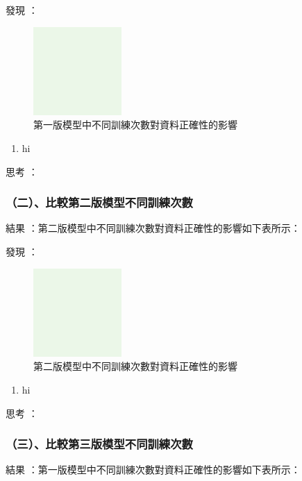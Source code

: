 \documentclass[8pt,a4paper,MingLiU,UTF8]{article}
\def\xeCJKembold{0.4}
\def\saveCJKnode{\dimen255\lastkern}
\def\restoreCJKnode{\kern-\dimen255\kern\dimen255}
\let\CJKoldsymbol\CJKsymbol
\let\CJKoldpunctsymbol\CJKpunctsymbol
\def\CJKfakeboldsymbol#1{%
	\special{pdf:literal direct 2 Tr \xeCJKembold\space w}%
	\CJKoldsymbol{#1}%
	\saveCJKnode
	\special{pdf:literal direct 0 Tr}%
	\restoreCJKnode}
\def\CJKfakeboldpunctsymbol#1{%
	\special{pdf:literal direct 2 Tr \xeCJKembold\space w}%
	\CJKoldpunctsymbol{#1}%
	\saveCJKnode
	\special{pdf:literal direct 0 Tr}%
	\restoreCJKnode}
\newcommand\CJKfakebold[1]{%
	\let\CJKsymbol\CJKfakeboldsymbol
	\let\CJKpunctsymbol\CJKfakeboldpunctsymbol
	#1%
	\let\CJKsymbol\CJKoldsymbol
	\let\CJKpunctsymbol\CJKoldpunctsymbol}
\begin{document}
	\CJKfakebold{發現}：
	
	\begin{figure}
		\centering
		\includegraphics[width=0.3\textwidth]{dummy}
		\caption{第一版模型中不同訓練次數對資料正確性的影響}
	\end{figure}
	\begin{enumerate}
		\item hi
	\end{enumerate}

	\CJKfakebold{思考}：
	
	\subsubsection{（二）、比較第二版模型不同訓練次數}
		\CJKfakebold{結果}：第二版模型中不同訓練次數對資料正確性的影響如下表所示：
	
	\CJKfakebold{發現}：
	
	\begin{figure}
		\centering
		\includegraphics[width=0.3\textwidth]{dummy}
		\caption{第二版模型中不同訓練次數對資料正確性的影響}
	\end{figure}
	\begin{enumerate}
		\item hi
	\end{enumerate}
	
	\CJKfakebold{思考}：
	
	\subsubsection{（三）、比較第三版模型不同訓練次數}
		\CJKfakebold{結果}：第一版模型中不同訓練次數對資料正確性的影響如下表所示：
	
\end{document}
